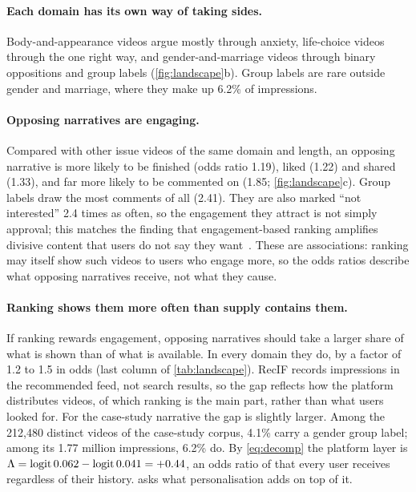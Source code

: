 \paragraph{Each domain has its own way of taking sides.} Body-and-appearance videos argue mostly through anxiety, life-choice videos through the one right way, and gender-and-marriage videos through binary oppositions and group labels (\cref{fig:landscape}b). Group labels are rare outside gender and marriage, where they make up 6.2\% of impressions.

\paragraph{Opposing narratives are engaging.} Compared with other issue videos of the same domain and length, an opposing narrative is more likely to be finished (odds ratio 1.19), liked (1.22) and shared (1.33), and far more likely to be commented on (1.85; \cref{fig:landscape}c). Group labels draw the most comments of all (2.41). They are also marked ``not interested'' 2.4 times as often, so the engagement they attract is not simply approval; this matches the finding that engagement-based ranking amplifies divisive content that users do not say they want~\citep{milli2025engagement}. These are associations: ranking may itself show such videos to users who engage more, so the odds ratios describe what opposing narratives receive, not what they cause.

\paragraph{Ranking shows them more often than supply contains them.}\label{sec:platform} If ranking rewards engagement, opposing narratives should take a larger share of what is shown than of what is available. In every domain they do, by a factor of 1.2 to 1.5 in odds (last column of \cref{tab:landscape}). RecIF records impressions in the recommended feed, not search results, so the gap reflects how the platform distributes videos, of which ranking is the main part, rather than what users looked for. For the case-study narrative the gap is slightly larger. Among the 212{,}480 distinct videos of the case-study corpus, 4.1\% carry a gender group label; among its 1.77 million impressions, 6.2\% do. By \cref{eq:decomp} the platform layer is $\Lambda=\operatorname{logit} 0.062-\operatorname{logit} 0.041=+0.44$, an odds ratio of \nPlatformOdds{} that every user receives regardless of their history.  asks what personalisation adds on top of it.


